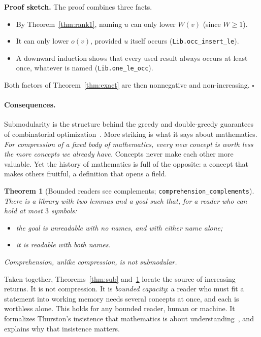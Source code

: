 \documentclass[11pt]{article}
\newtheorem{theorem}{Theorem}
\theoremstyle{remark}
\newcommand{\lean}[1]{\texttt{#1}}
\begin{document}
\noindent \textbf{Proof sketch.} The proof combines three facts.
\begin{itemize}
\item By Theorem~\ref{thm:rank1}, naming $u$ can only lower $W(v)$ (since $W\ge1$).
\item It can only lower $o(v)$, provided $u$ itself occurs (\lean{Lib.occ\_insert\_le}).
\item A downward induction shows that every used result always occurs at least once,
  whatever is named (\lean{Lib.one\_le\_occ}).
\end{itemize}
Both factors of Theorem~\ref{thm:exact} are then nonnegative and non-increasing.
\hfill$\square$

\paragraph{Consequences.} Submodularity is the structure behind the greedy and
double-greedy guarantees of combinatorial optimization~\cite{nwf,buchbinder}. More
striking is what it says about mathematics. \emph{For compression of a fixed body of
mathematics, every new concept is worth less the more concepts we already have.} Concepts
never make each other more valuable. Yet the history of mathematics is full of the
opposite: a concept that makes others fruitful, a definition that opens a field.

\begin{theorem}[Bounded readers see complements; \lean{comprehension\_complements}]\label{thm:compl}
There is a library with two lemmas and a goal such that, for a reader who can hold at most
$3$ symbols:
\begin{itemize}
\item the goal is unreadable with no names, and with either name alone;
\item it is readable with both names.
\end{itemize}
Comprehension, unlike compression, is not submodular.
\end{theorem}

\noindent Taken together, Theorems~\ref{thm:sub} and~\ref{thm:compl} locate the source of
increasing returns. It is not compression. It is \emph{bounded capacity}: a reader who must
fit a statement into working memory needs several concepts at once, and each is worthless
alone. This holds for any bounded reader, human or machine. It formalizes Thurston's
insistence that mathematics is about understanding~\cite{thurston}, and explains why that
insistence matters.
\end{document}
